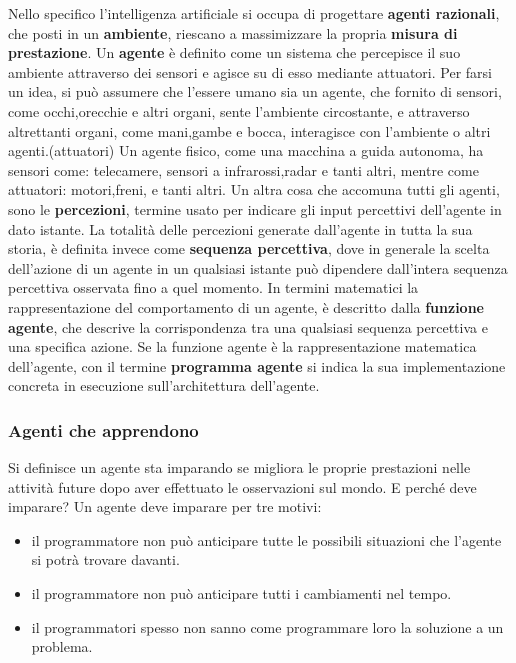 \documentclass[14pt]{extarticle}
\begin{document}
Nello specifico l'intelligenza artificiale si occupa di progettare \textbf{agenti razionali}, che posti in un \textbf{ambiente}, riescano a massimizzare la propria \textbf{misura di prestazione}.\cite{russell2005intelligenza}
Un \textbf{agente} è definito  come un sistema che percepisce il suo ambiente attraverso dei sensori e agisce su di esso mediante attuatori. Per farsi un idea, si può assumere che l'essere umano sia un agente, che fornito di sensori, come occhi,orecchie e altri organi, sente l'ambiente circostante, e attraverso altrettanti organi, come mani,gambe e bocca, interagisce con l'ambiente o altri agenti.(attuatori)
Un agente fisico, come una macchina a guida autonoma, ha sensori come: telecamere, sensori a infrarossi,radar e tanti altri, mentre come attuatori: motori,freni, e tanti altri. 
Un altra cosa che accomuna tutti gli agenti, sono le  \textbf{percezioni}, termine usato per indicare gli input percettivi dell'agente in dato istante.\cite{russell2005intelligenza}
La totalità delle percezioni generate dall'agente in tutta la sua storia, è definita invece come \textbf{sequenza percettiva}, dove in generale la scelta dell'azione di un agente in un qualsiasi istante può dipendere dall'intera sequenza percettiva osservata fino a quel momento.
In termini matematici la rappresentazione del comportamento di un agente, è descritto dalla \textbf{funzione agente}, che descrive la corrispondenza tra una qualsiasi sequenza percettiva e una specifica azione.
Se la funzione agente è la rappresentazione matematica dell'agente, con il termine \textbf{programma agente} si indica la sua implementazione concreta  in  esecuzione sull'architettura dell'agente.  \cite{russell2005intelligenza}
\subsubsection{Agenti che apprendono}
Si definisce un agente sta imparando se migliora le proprie prestazioni nelle attività future dopo aver effettuato le osservazioni
sul mondo. \cite{russell2005intelligenza}
E perché deve imparare?
Un agente deve imparare per tre motivi:
\begin{itemize}
\item  il programmatore non può anticipare tutte le possibili situazioni che l'agente si potrà trovare davanti.
\item il programmatore non può anticipare tutti i cambiamenti nel tempo.
\item il programmatori spesso non sanno come programmare loro la soluzione a un problema.
\end{itemize}\cite{russell2005intelligenza}
\end{document}
